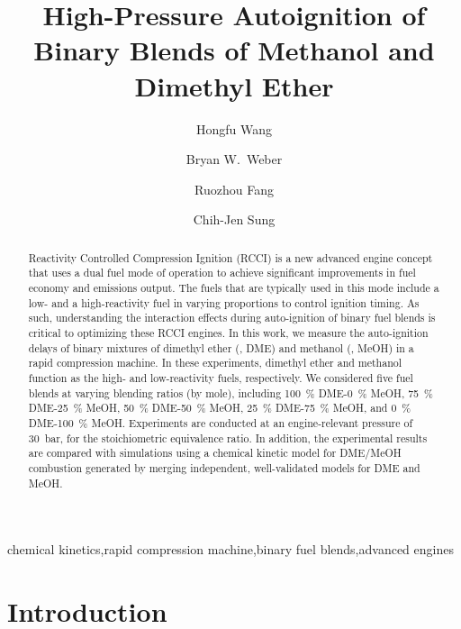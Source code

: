 \documentclass[12pt]{../ussci}
\title{ High-Pressure Autoignition of Binary Blends of Methanol and Dimethyl Ether }
\author[1]{Hongfu Wang}
\author[2*]{Bryan W.\ Weber}
\author[2]{Ruozhou Fang}
\author[2]{Chih-Jen Sung}
\affil[2]{Department of Mechanical Engineering, University of Connecticut, Storrs,
CT, USA}
\affil[*]{Corresponding Author: \email{bryan.weber@uconn.edu}}
\begin{document}
\maketitle

\begin{abstract} %

    Reactivity Controlled Compression Ignition (RCCI) is a new advanced engine
    concept that uses a dual fuel mode of operation to achieve significant
    improvements in fuel economy and emissions output. The fuels that are
    typically used in this mode include a low- and a high-reactivity fuel in
    varying proportions to control ignition timing. As such, understanding the
    interaction effects during auto-ignition of binary fuel blends is critical
    to optimizing these RCCI engines. In this work, we measure the auto-ignition
    delays of binary mixtures of dimethyl ether (, DME) and methanol
    (, MeOH) in a rapid compression machine. In these experiments,
    dimethyl ether and methanol function as the high- and low-reactivity fuels,
    respectively. We considered five fuel blends at varying blending ratios (by
    mole), including \SI{100}{\percent} DME-\SI{0}{\percent} MeOH,
    \SI{75}{\percent} DME-\SI{25}{\percent} MeOH, \SI{50}{\percent}
    DME-\SI{50}{\percent} MeOH, \SI{25}{\percent} DME-\SI{75}{\percent} MeOH,
    and \SI{0}{\percent} DME-\SI{100}{\percent} MeOH. Experiments are conducted
    at an engine-relevant pressure of \SI{30}{\bar}, for the stoichiometric
    equivalence ratio. In addition, the experimental results are compared with
    simulations using a chemical kinetic model for DME/MeOH combustion generated
    by merging independent, well-validated models for DME and MeOH.

\end{abstract}

\begin{keyword}
    chemical kinetics\sep rapid compression machine\sep binary fuel blends\sep advanced engines
\end{keyword}

\section{Introduction}\label{introduction}
\end{document}
